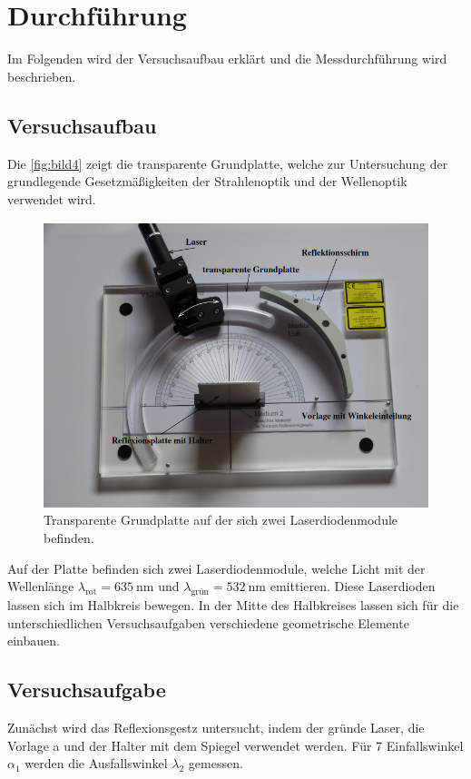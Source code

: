 \section{Durchführung}
\label{sec:durchführung}

Im Folgenden wird der Versuchsaufbau erklärt und die Messdurchführung wird beschrieben.

\subsection{Versuchsaufbau}
\label{sec:Versuchsaufbau}
Die \autoref{fig:bild4} zeigt die transparente Grundplatte, welche zur Untersuchung der grundlegende Gesetzmäßigkeiten der Strahlenoptik und der Wellenoptik
verwendet wird.
\begin{figure}[H]
    \centering
	\includegraphics[width=0.6\linewidth]{content/grafik/aufbau.png}
	\caption{Transparente Grundplatte auf der sich zwei Laserdiodenmodule befinden. \cite{reflex}}
	\label{fig:bild4}
\end{figure}
Auf der Platte befinden sich zwei Laserdiodenmodule, welche Licht mit der Wellenlänge $\lambda_{\text{rot}} = \SI{635}{\nano\meter}$ und
$\lambda_{\text{grün}} = \SI{532}{\nano\meter}$ emittieren. Diese Laserdioden lassen sich im Halbkreis bewegen.
In der Mitte  des Halbkreises lassen sich für die unterschiedlichen Versuchsaufgaben verschiedene geometrische Elemente einbauen.

\subsection{Versuchsaufgabe}
\label{sec:Versuchsaufgaben}

Zunächst wird das Reflexionsgestz untersucht, indem der gründe Laser, die Vorlage a und der Halter mit dem Spiegel verwendet werden.
Für 7 Einfallswinkel $\alpha_1$ werden die Ausfallswinkel $\lambda_2$ gemessen.

